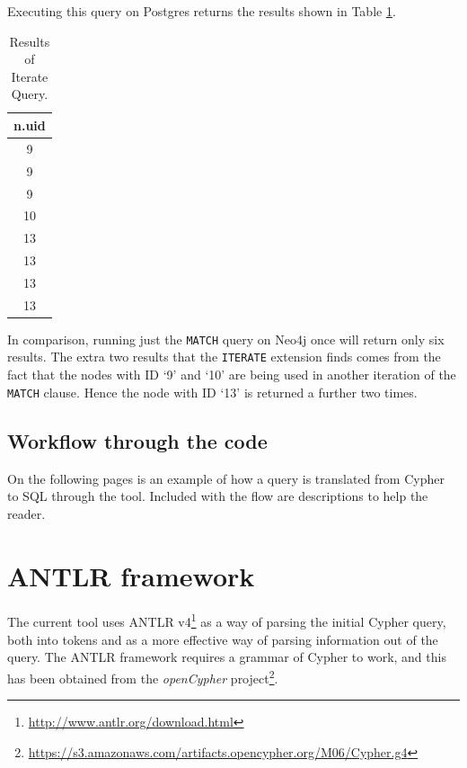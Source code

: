 \documentclass[letterpaper]{ltxdoc}
\begin{document}
\newpage

Executing this query on Postgres returns the results shown in Table \ref{table:queryIter}.

\begin{table}[!h]
\caption{Results of Iterate Query.} %
\centering %
\begin{tabular}{c} %
\hline\hline %
n.uid \\ [0.5ex] %
\hline %
9 \\
9 \\
9 \\
10 \\
13 \\
13 \\
13 \\
13 \\ [1ex] %
\hline %
\end{tabular}
\label{table:queryIter} %
\end{table}

In comparison, running just the \texttt{MATCH} query on Neo4j once will return only six results. The extra two results that the \texttt{ITERATE} extension finds comes from the fact that the nodes with ID `9' and `10' are being used in another iteration of the \texttt{MATCH} clause. Hence the node with ID `13' is returned a further two times.

\subsection{Workflow through the code}
\label{ssec:workflow}
On the following pages is an example of how a query is translated from Cypher to SQL through the tool. Included with the flow are descriptions to help the reader.

\newpage



\section{ANTLR framework}
\label{sec:antlr}
The current tool uses ANTLR v4\footnote{\url{http://www.antlr.org/download.html}} as a way of parsing the initial Cypher query, both into tokens and as a more effective way of parsing information out of the query. The ANTLR framework requires a grammar of Cypher to work, and this has been obtained from the \emph{openCypher} project\footnote{\url{https://s3.amazonaws.com/artifacts.opencypher.org/M06/Cypher.g4}}.
\end{document}
